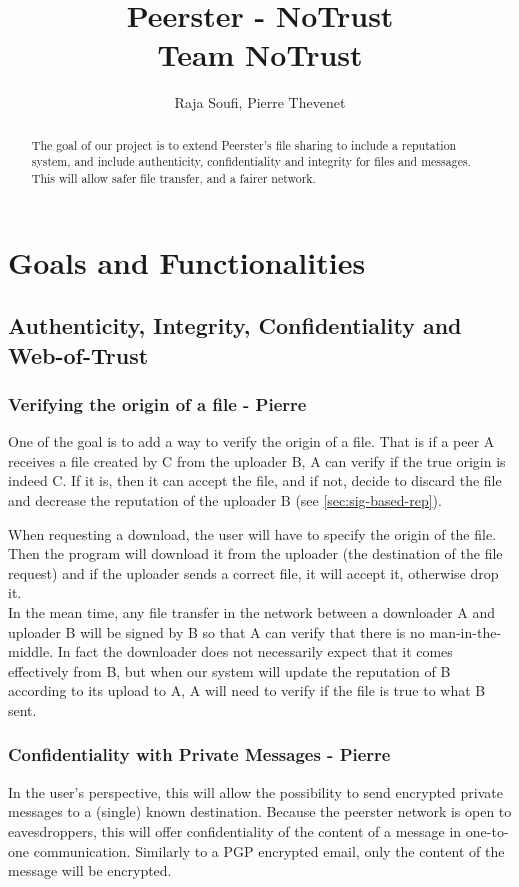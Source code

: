 \documentclass[]{article}
\title{Peerster - NoTrust\\
\large Team NoTrust}
\author{Raja Soufi, Pierre Thevenet}
\begin{document}
\maketitle

\begin{abstract}
The goal of our project is to extend Peerster's file sharing to include a reputation system, and include authenticity, confidentiality and integrity for files and messages. This will allow safer file transfer, and a fairer network.
\end{abstract}

\section{Goals and Functionalities}


\subsection{Authenticity, Integrity, Confidentiality and Web-of-Trust}

\subsubsection{Verifying the origin of a file - Pierre}
\label{sec:goals-funcs-auth-integrity}
One of the goal is to add a way to verify the origin of a file. That is if a peer A receives a file created by C from the uploader B, A can verify if the true origin is indeed C. If it is, then it can accept the file, and if not, decide to discard the file and decrease the reputation of the uploader B (see \ref{sec:sig-based-rep}).

When requesting a download, the user will have to specify the origin of the file. Then the program will download it from the uploader (the destination of the file request) and if the uploader sends a correct file, it will accept it, otherwise drop it. \\

In the mean time, any file transfer in the network between a downloader A and uploader B will be signed by B so that A can verify that there is no man-in-the-middle. In fact the downloader does not necessarily expect that it comes effectively from B, but when our system will update the reputation of B according to its upload to A, A will need to verify if the file is true to what B sent. 

\subsubsection{Confidentiality with Private Messages - Pierre}
In the user's perspective, this will allow the possibility to send encrypted private messages to a (single) known destination. Because the peerster network is open to eavesdroppers, this will offer confidentiality of the content of a message in one-to-one communication. Similarly to a PGP encrypted email, only the content of the message will be encrypted.
\end{document}
